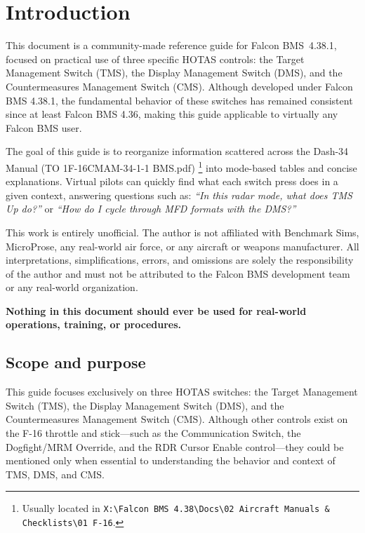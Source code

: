 \documentclass[11pt, a4paper, twoside]{report}
\newcommand{\bmsver}{Falcon BMS~4.38.1}
\begin{document}
\chapter{Introduction}
\label{chap:C1}

This document is a community-made reference guide for \bmsver, focused on practical use of three specific HOTAS controls: the Target Management Switch (TMS), the Display Management Switch (DMS), and the Countermeasures Management Switch (CMS). Although developed under Falcon BMS 4.38.1, the fundamental behavior of these switches has remained consistent since at least Falcon BMS 4.36, making this guide applicable to virtually any Falcon BMS user.

The goal of this guide is to reorganize information scattered across the Dash-34 Manual (TO 1F-16CMAM-34-1-1 BMS.pdf) \footnote{Usually located in \texttt{X:\textbackslash Falcon BMS 4.38\textbackslash Docs\textbackslash02 Aircraft Manuals \& Checklists\textbackslash 01 F-16}.} into mode-based tables and concise explanations. Virtual pilots can quickly find what each switch press does in a given context, answering questions such as: \emph{``In this radar mode, what does TMS Up do?''} or \emph{``How do I cycle through MFD formats with the DMS?''}

This work is entirely unofficial. The author is not affiliated with Benchmark Sims, MicroProse, any real-world air force, or any aircraft or weapons manufacturer. All interpretations, simplifications, errors, and omissions are solely the responsibility of the author and must not be attributed to the Falcon BMS development team or any real-world organization.

\textbf{Nothing in this document should ever be used for real-world operations, training, or procedures.}

\section{Scope and purpose}
\label{sec:C1-S1}

This guide focuses exclusively on three HOTAS switches: the Target Management Switch (TMS), the Display Management Switch (DMS), and the Countermeasures Management Switch (CMS). Although other controls exist on the F-16 throttle and stick---such as the Communication Switch, the Dogfight/MRM Override, and the RDR Cursor Enable control---they could be mentioned only when essential to understanding the behavior and context of TMS, DMS, and CMS.
\end{document}
